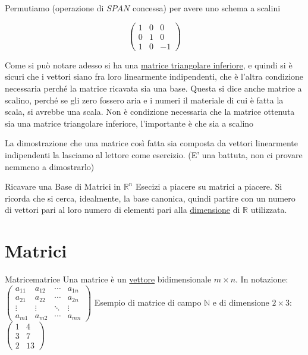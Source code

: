 \documentclass{article}
\begin{document}
Permutiamo (operazione di \hyperref[def:funzione_span]{$SPAN$} concessa) per avere uno schema a scalini

\[\begin{pmatrix}
1 & 0 & 0 \\
0 & 1 & 0 \\
1 & 0 & -1
\end{pmatrix}\]

Come si può notare adesso si ha una \hyperref[def:matrice_triangolare_inferiore]{matrice triangolare inferiore}, e quindi si è sicuri che i vettori siano fra loro linearmente indipendenti, che è l'altra condizione necessaria perché la matrice ricavata sia una base. Questa si dice anche matrice a scalino, perché se gli zero fossero aria e i numeri il materiale di cui è fatta la scala, si avrebbe una scala. Non è condizione necessaria che la matrice ottenuta sia una matrice triangolare inferiore, l'importante è che sia a scalino

La dimostrazione che una matrice così fatta sia composta da vettori linearmente indipendenti la lasciamo al lettore come esercizio. (E' una battuta, non ci provare nemmeno a dimostrarlo)

\begin{exercise}{Ricavare una Base di Matrici in $\mathbb{R}^n$}{}
    Esecizi a piacere su matrici a piacere. Si ricorda che si cerca, idealmente, la base canonica, quindi partire con un numero di vettori pari al loro numero di elementi pari alla \hyperref[def:dimensione_spazio_vettoriale]{dimensione} di $\mathbb{R}$ utilizzata.
\end{exercise}

\section{Matrici}

\begin{definition}{Matrice}{matrice}
    Una matrice è un \hyperref[def:vettore]{vettore} bidimensionale $m \times n$. In notazione: $\begin{pmatrix}
    a_{11} & a_{12} & \cdots & a_{1n} \\
    a_{21} & a_{22} & \cdots & a_{2n} \\
    \vdots & \vdots & \ddots & \vdots \\
    a_{m1} & a_{m2} & \cdots & a_{mn}
    \end{pmatrix}$ Esempio di matrice di campo $\mathbb{N}$ e di dimensione $2 \times 3$: $\begin{pmatrix}
    1 & 4 \\
    3 & 7 \\
    2 & 13
    \end{pmatrix}$
\end{definition}
\end{document}
